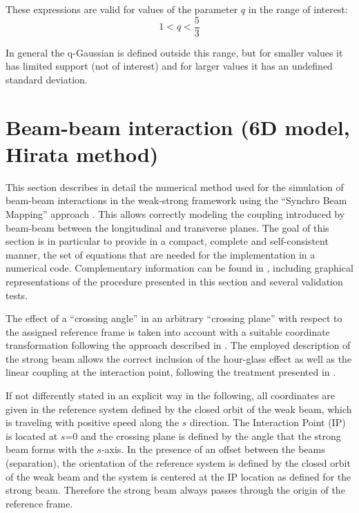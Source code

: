 These expressions are valid for values of the parameter $q$ in the range of interest:
\begin{equation}
1<q<\frac{5}{3}
\end{equation}

In general the q-Gaussian is defined outside this range, but for smaller values it has limited support (not of interest) and for larger values it has an undefined standard deviation.

\section{Beam-beam interaction (6D model, Hirata method)}

This section describes in detail the numerical method used for the simulation of beam-beam interactions in the weak-strong framework using the ``Synchro Beam Mapping'' 
approach \cite{hirata, hirata_crossing_angle}.  This allows correctly modeling the coupling introduced by beam-beam between the longitudinal and transverse planes. The goal of this section is  in particular to provide in a compact, complete and self-consistent manner, the set of equations that are needed for the implementation in a numerical code. 
Complementary information can be found in \cite{bb6dslides}, including graphical representations of the procedure presented in this section and several validation tests.

The effect of a ``crossing angle'' in an arbitrary ``crossing plane'' with respect to the assigned reference frame is taken into account with a suitable coordinate transformation following the approach described in \cite{hirata, beam_beam}. The employed description of the strong beam allows the correct inclusion of the hour-glass effect as well as the linear coupling at the interaction point, following the treatment presented in \cite{beam_beam}. 


If not differently stated in an explicit way in the following, all coordinates are given in the reference system defined by the closed orbit of the weak beam, which is traveling with positive speed along the $s$ direction. The Interaction Point (IP) is located at $s$=0 and the crossing plane is defined by the angle that the strong beam forms with the $s$-axis. In the presence of an offset between the beams (separation), the orientation of the reference system is defined by the closed orbit of the weak beam and the system is centered at the IP location as defined for the strong beam. Therefore the strong beam always passes through the origin of the reference frame.


